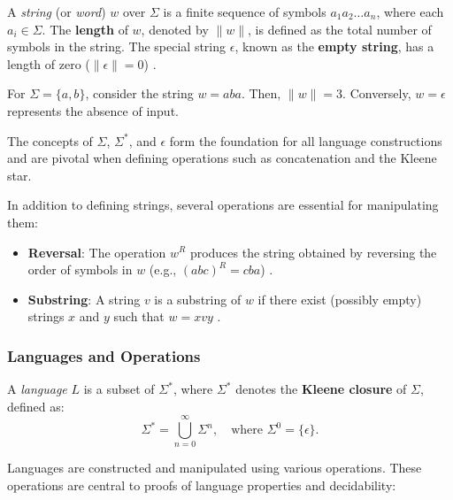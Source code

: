 A \textit{string} (or \textit{word}) $w$ over $\Sigma$ is a finite sequence of symbols $a_1a_2\ldots a_n$, where each $a_i \in \Sigma$. The \textbf{length} of $w$, denoted by $\|w\|$, is defined as the total number of symbols in the string. The special string $\epsilon$, known as the \textbf{empty string}, has a length of zero ($\|\epsilon\| = 0$) \cite{hopcroft2006introduction}.

\begin{example}
For $\Sigma = \{a, b\}$, consider the string $w = aba$. Then, $\|w\| = 3$. Conversely, $w = \epsilon$ represents the absence of input.
\end{example}

\begin{remark}
The concepts of $\Sigma$, $\Sigma^\ast$, and $\epsilon$ form the foundation for all language constructions and are pivotal when defining operations such as concatenation and the Kleene star.
\end{remark}

In addition to defining strings, several operations are essential for manipulating them:
\begin{itemize}
    \item \textbf{Reversal}: The operation $w^R$ produces the string obtained by reversing the order of symbols in $w$ (e.g., $(abc)^R = cba$) \cite{hopcroft2006introduction}.
    \item \textbf{Substring}: A string $v$ is a substring of $w$ if there exist (possibly empty) strings $x$ and $y$ such that $w = xvy$ \cite{hopcroft2006introduction}.
\end{itemize}

\subsubsection{Languages and Operations}
A \textit{language} $L$ is a subset of $\Sigma^\ast$, where $\Sigma^\ast$ denotes the \textbf{Kleene closure} of $\Sigma$, defined as:
\[
\Sigma^\ast = \bigcup_{n=0}^\infty \Sigma^n, \quad \text{where } \Sigma^0 = \{\epsilon\}.
\]
\cite{kleene1956representation}

Languages are constructed and manipulated using various operations. These operations are central to proofs of language properties and decidability:

